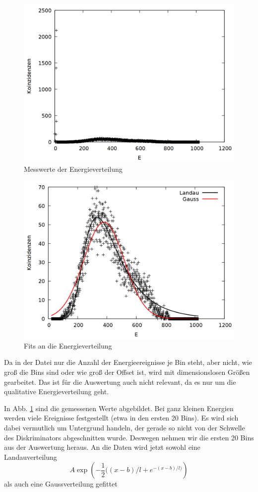\begin{figure}
\centering
\includegraphics[width=0.75\linewidth]{data/friedrich/mca_raw.png}
\caption{Messwerte der Energieverteilung}
\label{fig:mca_raw}
\end{figure}

\begin{figure}
\centering
\includegraphics[width=0.75\linewidth]{data/friedrich/mca.png}
\caption{Fits an die Energieverteilung}
\label{fig:mca}
\end{figure}

Da in der Datei nur die Anzahl der Energieereignisse je Bin steht, aber nicht, wie groß die Bins sind oder wie groß der Offset ist, wird mit dimensionslosen Größen gearbeitet. Das ist für die Auswertung auch nicht relevant, da es nur um die qualitative Energieverteilung geht.  

In Abb. \ref{fig:mca_raw} sind die gemessenen Werte abgebildet. Bei ganz kleinen Energien werden viele Ereignisse festgestellt (etwa in den ersten 20 Bins). Es wird sich dabei vermutlich um Untergrund handeln, der gerade so nicht von der Schwelle des Diskriminators abgeschnitten wurde. Deswegen nehmen wir die ersten 20 Bins aus der Auswertung heraus. An die Daten wird jetzt sowohl eine Landauverteilung
\[A\exp{\left(-\frac{1}{2}((x-b)/l + e^{-(x-b)/l)}\right)}\] als auch eine Gaussverteilung gefittet

